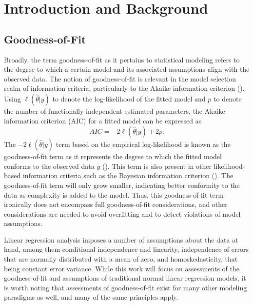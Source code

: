 \documentclass[12pt]{article} %
\renewcommand{\theequation}{\thesection\arabic{equation}}
\theoremstyle{definition}
\begin{document}
\def\thefigure{\arabic{figure}}
\def\thetable{\arabic{table}}

\renewcommand{\theequation}{\thesection.\arabic{equation}}


\fontsize{12}{14pt plus.8pt minus .6pt}\selectfont



\section{Introduction and Background}

	\subsection*{Goodness-of-Fit}

    	Broadly, the term goodness-of-fit as it pertains to statistical modeling refers to the degree to which a certain model
		and its associated assumptions align with the observed data. The notion of goodness-of-fit is relevant in the model selection realm of information criteria, particularly to the Akaike
		information criterion (\cite{Akaike}). Using $\ell(\hat{\theta}|y)$ to denote the log-likelihood of the fitted model and $p$ to denote the
		number of functionally independent estimated parameters, the Akaike information criterion (AIC) for a fitted model can be expressed as
		\begin{equation*}
			AIC = -2 \ell(\hat{\theta}|y) + 2 p.
		\end{equation*}
		The $-2 \ell(\hat{\theta}|y)$ term based on the empirical log-likelihood is known as the goodness-of-fit term as it represents the degree to which the fitted model
		conforms to the observed data $y$ (\cite{Cavanaugh}). This term is also present in other likelihood-based information criteria such as the Bayesian information criterion (\cite{Schwarz}).
		The goodness-of-fit term will only grow smaller, indicating better conformity to the data as complexity is added to the model. Thus, this goodness-of-fit term ironically does
		not encompass full goodness-of-fit considerations, and other considerations are needed to avoid overfitting and to detect violations of model assumptions.

		Linear regression analysis imposes a number of assumptions about the data at hand, among them conditional independence and linearity, independence of errors that are normally distributed with a mean of zero,
		and homoskedasticity, that being constant error variance. While this work will focus on assessments of the goodness-of-fit and assumptions of traditional normal linear regression models, it is worth noting
		that assessments of goodness-of-fit exist for many other modeling paradigms as well, and many of the same principles apply.
		
\end{document}
